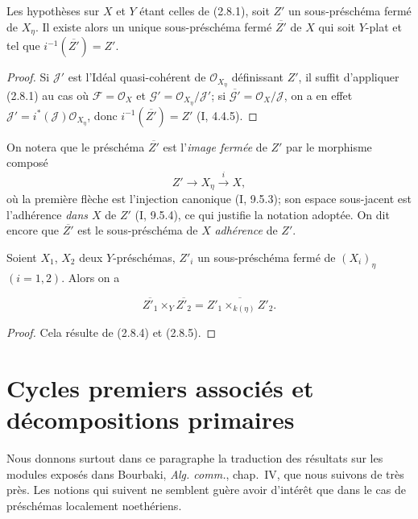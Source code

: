 \begin{proposition}[2.8.5]
\label{IV.2.8.5-fr}
Les hypothèses sur $X$ et $Y$ étant celles de (2.8.1), soit $Z'$ un
sous-préschéma fermé de $X_\eta$. Il existe alors un unique sous-préschéma
fermé $\overline{Z'}$ de $X$ qui soit $Y$-plat et tel que
$i^{-1}(\overline{Z'})=Z'$.
\end{proposition}

\begin{proof}
Si $\mathcal J'$ est l'Idéal quasi-cohérent de $\mathcal O_{X_\eta}$
définissant $Z'$, il suffit d'appliquer (2.8.1) au cas où
$\mathcal F=\mathcal O_X$ et
$\mathcal G'=\mathcal O_{X_\eta}/\mathcal J'$; si
$\overline{\mathcal G'}=\mathcal O_X/\mathcal J$, on a en effet
$\mathcal J'=i^*(\mathcal J)\mathcal O_{X_\eta}$, donc
$i^{-1}(\overline{Z'})=Z'$ (I, 4.4.5).
\end{proof}

On notera que le préschéma $\overline{Z'}$ est l'\emph{image fermée} de $Z'$
par le morphisme composé
\[
Z'\longrightarrow X_\eta\xrightarrow{i}X,
\]
où la première flèche est l'injection canonique (I, 9.5.3); son espace
sous-jacent est l'adhérence \emph{dans $X$} de $Z'$ (I, 9.5.4), ce qui
justifie la notation adoptée. On dit encore que $\overline{Z'}$ est le
sous-préschéma de $X$ \emph{adhérence} de $Z'$.

\begin{corollary}[2.8.6]
\label{IV.2.8.6-fr}
Soient $X_1$, $X_2$ deux $Y$-préschémas, $Z'_i$ un sous-préschéma fermé de
$(X_i)_\eta$ $(i=1,2)$. Alors on a
\end{corollary}

\begin{env}[2.8.6.1]
\label{IV.2.8.6.1-fr}
\[
\overline{Z'_1}\times_Y\overline{Z'_2}
=\overline{Z'_1\times_{k(\eta)}Z'_2}.
\]
\end{env}

\begin{proof}
Cela résulte de (2.8.4) et (2.8.5).
\end{proof}

\section{Cycles premiers associés et décompositions primaires}

Nous donnons surtout dans ce paragraphe la traduction des résultats sur les
modules exposés dans Bourbaki, \emph{Alg. comm.}, chap.~IV, que nous suivons de
très près. Les notions qui suivent ne semblent guère avoir d'intérêt que dans
le cas de préschémas localement noethériens.

